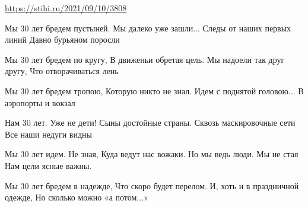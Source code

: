  
 
 
 
 

\url{https://stihi.ru/2021/09/10/3808}

Мы 30 лет бредем пустыней.
Мы далеко уже зашли...
Следы от наших первых линий
Давно бурьяном поросли

Мы 30 лет бредем по кругу,
В движеньи обретая цель.
Мы надоели так друг другу,
Что отворачиваться лень

Мы 30 лет бредем тропою,
Которую никто не знал.
Идем с поднятой головою...
В аэропорты и вокзал

Нам 30 лет. Уже не дети!
Сыны достойные страны.
Сквозь маскировочные сети
Все наши недуги видны

Мы 30 лет идем. Не зная,
Куда ведут нас вожаки.
Но мы ведь люди. Мы не стая
Нам цели ясные важны.

Мы 30 лет бредем в надежде,
Что скоро будет перелом.
И, хоть и в праздничной одежде,
Но сколько можно «а потом...»
